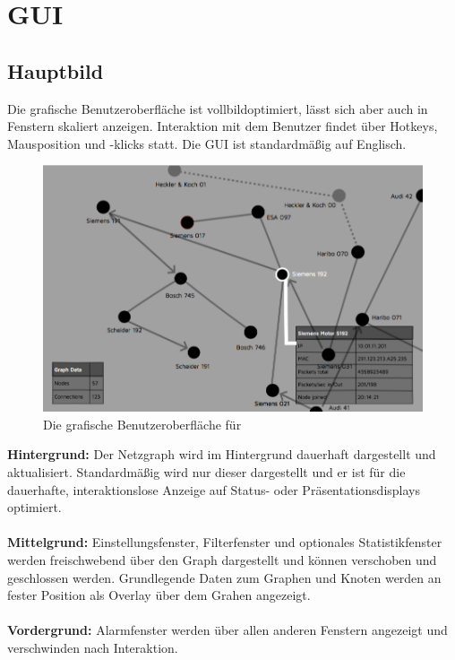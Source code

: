 \chapter{GUI}

\section{Hauptbild}
Die grafische Benutzeroberfläche ist vollbildoptimiert, lässt sich aber auch in
Fenstern skaliert anzeigen. Interaktion mit dem Benutzer findet über Hotkeys,
Mausposition und -klicks statt.
Die GUI ist standardmäßig auf Englisch.

  \begin{figure}[h!]
    \includegraphics[scale=0.45]{./img/GUI.png}
    \caption{Die grafische Benutzeroberfläche für \programname}
  \end{figure}

\noindent \textbf{Hintergrund:} Der Netzgraph wird im Hintergrund dauerhaft dargestellt und
aktualisiert. Standardmäßig wird nur dieser dargestellt und er ist für die
dauerhafte, interaktionslose Anzeige auf Status- oder Präsentationsdisplays
optimiert.
\\ \\
\textbf{Mittelgrund:} Einstellungsfenster, Filterfenster und optionales Statistikfenster
werden freischwebend über den Graph dargestellt und können verschoben und
geschlossen werden. Grundlegende Daten zum Graphen und Knoten werden an fester
Position als Overlay über dem Grahen angezeigt.
\\ \\
\textbf{Vordergrund:} Alarmfenster werden über allen anderen Fenstern angezeigt und
verschwinden nach Interaktion.


